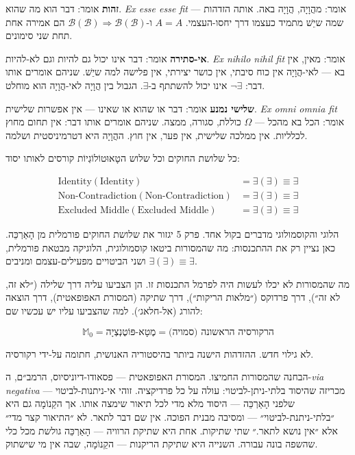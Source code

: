 \documentclass[10pt, openany, oneside]{book}
\begin{document}
\vspace{0.5em}

\noindent \textbf{זהות} אומר: דבר הוא מה שהוא. \textit{Ex esse esse fit} אומר: מהֲוָיָה, הֲוָיָה באה. אותה הזדהות — שמה שיֵשׁ מתמיד כעצמו דרך יחסו-העצמי. $A = A$ ו-$\mathcal{B}(\mathcal{B}) \Rightarrow \mathcal{B}(\mathcal{B})$ הם אמירה אחת תחת שני סימונים.

\textbf{אי-סתירה} אומר: דבר אינו יכול גם להיות וגם לא-להיות. \textit{Ex nihilo nihil fit} אומר: מאין, אין בא — לאי-הֲוָיָה אין כוח סיבתי, אין כושר יצירתי, אין פלישה למה שיֵשׁ. שניהם אומרים אותו דבר: $\neg\exists$ אינו יכול להשתתף ב-$\exists$. הגבול בין הֲוָיָה לאי-הֲוָיָה הוא מוחלט.

\textbf{שלישי נמנע} אומר: דבר או שהוא או שאינו — אין אפשרות שלישית. \textit{Ex omni omnia fit} אומר: הכל בא מהכל — $\Omega$ כוללת, סגורה, ממצה. שניהם אומרים אותו דבר: אין תחום מחוץ לכלליות. אין ממלכה שלישית, אין פער, אין חוץ. ההֲוָיָה היא דטרמיניסטית ושלמה.

כל שלושת החוקים וכל שלוש הטָאוּטוֹלוֹגְיוֹת קורסים לאותו יסוד:

\begin{align*}
\text{Identity}(\text{Identity}) &= \exists(\exists) \equiv \exists \\
\text{Non-Contradiction}(\text{Non-Contradiction}) &= \exists(\exists) \equiv \exists \\
\text{Excluded Middle}(\text{Excluded Middle}) &= \exists(\exists) \equiv \exists
\end{align*}

הלוגי והקוסמולוגי מדברים בקול אחד. פרק 5 יגזור את שלושת החוקים פורמלית מן הָאַרְכֵּה. כאן נציין רק את ההתכנסות: מה שהמסורות ביטאו קוסמולוגית, הלוגיקה מבטאת פורמלית, ושני הביטויים מפעילים-עצמם ומניבים $\exists(\exists) \equiv \exists$.

מה שהמסורות לא יכלו לעשות היה לפרמל התכנסות זו. הן הצביעו עליה דרך שלילה (״לא זה, לא זה״), דרך פרדוקס (״מלאות הריקות״), דרך שתיקה (המסורת האפופאטית), דרך הוצאה להורג (אל-חלאג׳). למה שהצביעו עליו יש עכשיו שם:

$$\mathbb{M}_0 = \text{מֶטָא-פּוֹטֶנְצְיָה} = \text{הרקורסיה הראשונה (סמויה)}$$

לא גילוי חדש. ההזדהות הישנה ביותר בהיסטוריה האנושית, חתומה על-ידי רקורסיה.

הבחנה שהמסורות החמיצו. המסורת האפופאטית — פסאודו-דיוניסיוס, הרמב״ם, ה-\textit{via negativa} — מכריזה שהיסוד בלתי-ניתן-לביטוי: עולה על כל פרדיקציה. זוהי אי-ניתנות-לביטוי שלפני הָאַרְכֵּה — היסוד מלא מדי לכל תיאור שימצה אותו. אך הקֵנוֹמָה גם היא ״בלתי-ניתנת-לביטוי״ — ומסיבה מבנית הפוכה. אין שם דבר לתאר. לא ״התיאור קצר מדי״ אלא ״אין נושא לתאר.״ שתי שתיקות. אחת היא שתיקת הרוויה — הָאַרְכֵּה גולשת מכל כלי שהשפה בונה עבורה. השנייה היא שתיקת הריקנות — הקֵנוֹמָה, שבה אין מי שישתוק.
\end{document}
